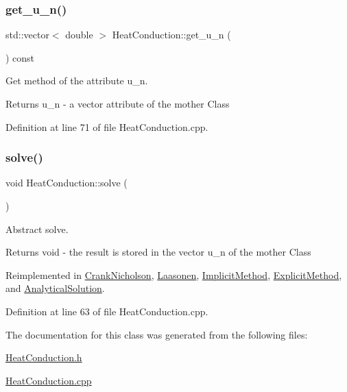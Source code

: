 \subsubsection{\texorpdfstring{get\+\_\+u\+\_\+n()}{get\_u\_n()}}
{\footnotesize\ttfamily std\+::vector$<$ double $>$ Heat\+Conduction\+::get\+\_\+u\+\_\+n (\begin{DoxyParamCaption}{ }\end{DoxyParamCaption}) const}



Get method of the attribute u\+\_\+n. 

\begin{DoxyReturn}{Returns}
u\+\_\+n -\/ a vector attribute of the mother Class 
\end{DoxyReturn}


Definition at line 71 of file Heat\+Conduction.\+cpp.

\mbox{\label{class_heat_conduction_ac176ea1a94c2fdb0da017b987ea22d1c}} 
\subsubsection{\texorpdfstring{solve()}{solve()}}
{\footnotesize\ttfamily void Heat\+Conduction\+::solve (\begin{DoxyParamCaption}{ }\end{DoxyParamCaption})\hspace{0.3cm}{\ttfamily [virtual]}}



Abstract solve. 

\begin{DoxyReturn}{Returns}
void -\/ the result is stored in the vector u\+\_\+n of the mother Class 
\end{DoxyReturn}


Reimplemented in \hyperlink{class_crank_nicholson_a2846912cccce367888c37bf0e58f1cb1}{Crank\+Nicholson}, \hyperlink{class_laasonen_a53cf5a72691175df0b3b6bdcbfee8c9b}{Laasonen}, \hyperlink{class_implicit_method_ae06909ac3cde1ae9fb216501c852e22c}{Implicit\+Method}, \hyperlink{class_explicit_method_a096efa29c4315794c60182e31c54a45e}{Explicit\+Method}, and \hyperlink{class_analytical_solution_afd1d8d955abbe0c5b7763544faad8dd2}{Analytical\+Solution}.



Definition at line 63 of file Heat\+Conduction.\+cpp.



The documentation for this class was generated from the following files\+:\begin{DoxyCompactItemize}
\item 
\hyperlink{_heat_conduction_8h}{Heat\+Conduction.\+h}\item 
\hyperlink{_heat_conduction_8cpp}{Heat\+Conduction.\+cpp}\end{DoxyCompactItemize}
